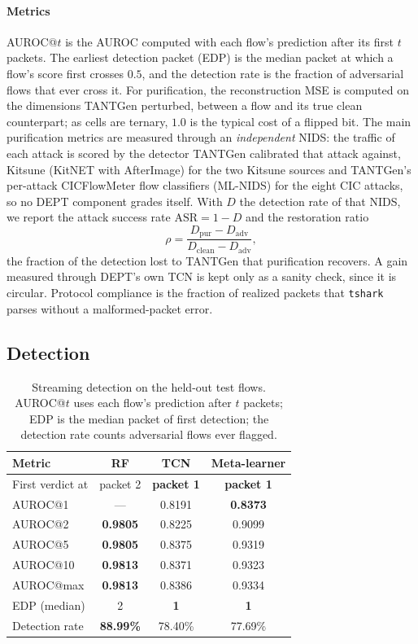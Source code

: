 \documentclass[acmtog,nonacm,pbalance]{acmart}
\begin{document}
\paragraph{Metrics} AUROC@$t$ is the AUROC computed with each flow's
prediction after its first $t$ packets. The earliest detection
packet (EDP) is the median packet at which a flow's score first crosses $0.5$,
and the detection rate is the fraction of adversarial flows that ever cross it.
For purification, the reconstruction MSE is computed on the dimensions TANTGen
perturbed, between a flow and its true clean counterpart; as cells are ternary,
$1.0$ is the typical cost of a flipped bit. The main purification metrics are
measured through an \emph{independent} NIDS: the traffic of each attack is
scored by the detector TANTGen calibrated that attack against, Kitsune
(KitNET with AfterImage) for the two Kitsune sources and TANTGen's per-attack
CICFlowMeter flow classifiers (ML-NIDS) for the eight CIC attacks, so no DEPT
component grades itself. With $D$ the detection rate of that NIDS, we report the
attack success rate $\text{ASR} = 1 - D$ and the restoration ratio
\begin{equation}
  \rho = \frac{D_{\text{pur}} - D_{\text{adv}}}{D_{\text{clean}} - D_{\text{adv}}},
  \label{eq:rho}
\end{equation}
the fraction of the detection lost to TANTGen that purification recovers. A
gain measured through DEPT's own TCN is kept only as a sanity check, since it
is circular. Protocol compliance is the fraction of realized packets that
\texttt{tshark} parses without a malformed-packet error.

\subsection{Detection}\label{sec:eval-detect}

\begin{table}[t]
  \caption{Streaming detection on the held-out test flows. AUROC@$t$ uses each
  flow's prediction after $t$ packets; EDP is the median packet of first
  detection; the detection rate counts adversarial flows ever flagged.}
  \label{tab:streaming}
  \footnotesize
  \begin{tabular}{@{}lccc@{}}
    \toprule
    Metric & RF & TCN & Meta-learner \\
    \midrule
    First verdict at & packet 2 & \textbf{packet 1} & \textbf{packet 1} \\
    AUROC@1 & --- & 0.8191 & \textbf{0.8373} \\
    AUROC@2 & \textbf{0.9805} & 0.8225 & 0.9099 \\
    AUROC@5 & \textbf{0.9805} & 0.8375 & 0.9319 \\
    AUROC@10 & \textbf{0.9813} & 0.8371 & 0.9323 \\
    AUROC@max & \textbf{0.9813} & 0.8386 & 0.9334 \\
    EDP (median) & 2 & \textbf{1} & \textbf{1} \\
    Detection rate & \textbf{88.99\%} & 78.40\% & 77.69\% \\
    \bottomrule
  \end{tabular}
\end{table}
\end{document}
